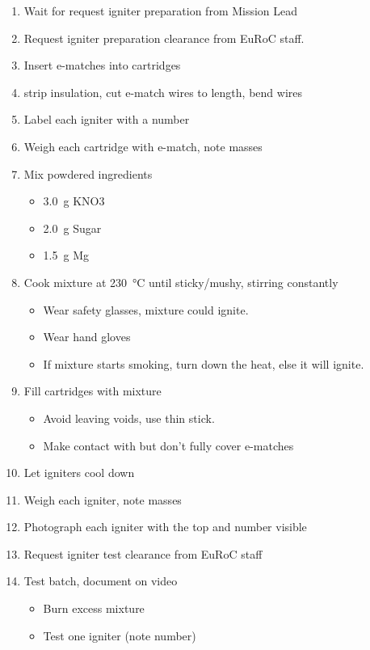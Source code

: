 \begin{enumerate}[label=R\arabic*.]
    \item \label{rocket_prep_igniters_start} Wait for request igniter preparation from Mission Lead\checkbox
    \item Request igniter preparation clearance from EuRoC staff.\checkbox
    \item Insert e-matches into cartridges \checkbox
    \item strip insulation, cut e-match wires to length, bend wires \checkbox
    \item Label each igniter with a number \checkbox
    \item Weigh each cartridge with e-match, note masses \checkbox
    \item Mix powdered ingredients \checkbox
    \begin{itemize}
        \item \SI{3.0}{\gram} KNO3
        \item \SI{2.0}{\gram} Sugar
        \item \SI{1.5}{\gram} Mg
    \end{itemize}
    \item Cook mixture at \SI{230}{\celsius} until sticky/mushy, stirring constantly \checkbox
    \begin{itemize}
        \item Wear safety glasses, mixture could ignite.
        \item Wear hand gloves
        \item If mixture starts smoking, turn down the heat, else it will ignite.
    \end{itemize}
    \item Fill cartridges with mixture \checkbox
    \begin{itemize}
        \item Avoid leaving voids, use thin stick.
        \item Make contact with but don't fully cover e-matches
    \end{itemize}
    \item Let igniters cool down \checkbox
    \item Weigh each igniter, note masses \checkbox
    \item Photograph each igniter with the top and number visible \checkbox
    \item Request igniter test clearance from EuRoC staff\checkbox
    \item \label{rocket_prep_igniters_end} Test batch, document on video \checkbox
    \begin{itemize}
        \item Burn excess mixture
        \item Test one igniter (note number)
    \end{itemize}

\label{end_section_igniter}
\end{enumerate}